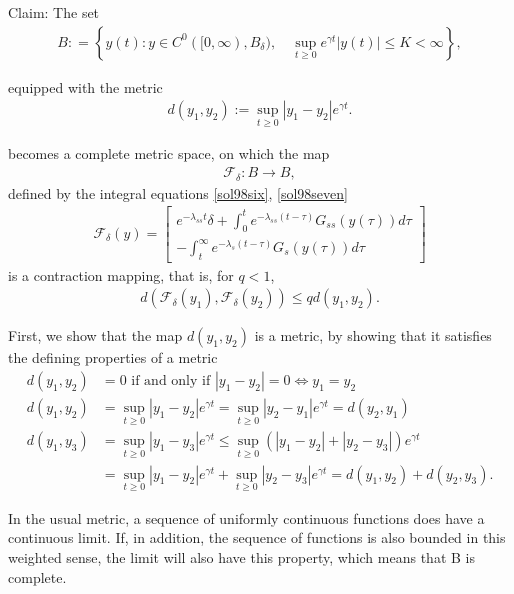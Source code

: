 \begin{solution}[9.8]
Claim: The set 
\begin{align}
B : = \left \{ y(t): y\in C^0 ([0, \infty), B_\delta ), \quad  \sup_{t\geq 0} e^{\gamma t}|y(t)|\leq K <\infty \right \},
\end{align}

equipped with the metric 
\begin{align}
d(y_1, y_2) := \sup_{t\geq 0} |y_1 - y_2|e^{\gamma t}. 
\end{align}

becomes a complete metric space, on which the map
\begin{align}
\mathcal{F}_\delta  : B \to B,
\end{align}
defined by the integral equations \eqref{sol98six}, \eqref{sol98seven}
\begin{align}
\mathcal{F}_\delta (y) = \begin{bmatrix} e^{-\lambda_{ss}t}\delta + \int_{0}^t e^{-\lambda_{ss}(t-\tau)}G_{ss}(y(\tau))d\tau \\
- \int_{t}^\infty e^{-\lambda_s(t-\tau)}G_s(y(\tau))d\tau
\end{bmatrix}
\end{align}
is a contraction mapping, that is, for $q<1$, 
\begin{align}
d(\mathcal{F}_\delta(y_1), \mathcal{F}_\delta(y_2))\leq q d(y_1, y_2). 
\end{align}

First, we show that the map $d(y_1, y_2)$ is a metric, by showing that it satisfies the defining properties of a metric
\begin{align}
    d(y_1, y_2) &= 0 \text{ if and only if } |y_1-y_2|=0 \Longleftrightarrow y_1=y_2 \\
    d(y_1, y_2) &= \sup_{t\geq 0} |y_1 - y_2|e^{\gamma t} = \sup_{t\geq 0} |y_2 - y_1|e^{\gamma t} = d(y_2, y_1) \\
    d(y_1, y_3) &= \sup_{t\geq 0} |y_1 - y_3|e^{\gamma t} \leq  \sup_{t\geq 0} (|y_1 - y_2| + |y_2 - y_3|)e^{\gamma t} \\ &= \sup_{t\geq 0} |y_1 - y_2|e^{\gamma t} + \sup_{t\geq 0}  |y_2 - y_3|e^{\gamma t} = d(y_1,y_2) + d(y_2, y_3).
\end{align}

In the usual metric, a sequence of uniformly continuous functions does have a continuous limit. If, in addition, the sequence of functions is also bounded in this weighted sense, the limit will also have this property, which means that B is complete. 


\end{solution}
